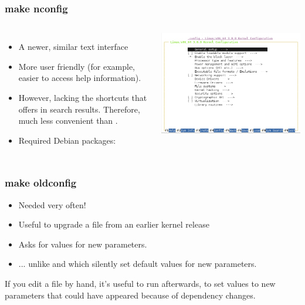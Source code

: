 \begin{frame}
  \frametitle{make nconfig}
  \begin{columns}
    \begin{itemize}
      \item A newer, similar text interface
      \item More user friendly (for example, easier to access help information).
      \item However, lacking the shortcuts that  offers
	in search results. Therefore, much less convenient than .
      \item Required Debian packages: 
    \end{itemize}
    \includegraphics[width=\textwidth]{slides/sysdev-kernel-building/nconfig-screenshot.png}
  \end{columns}
\end{frame}

\begin{frame}
  \frametitle{make oldconfig}
  \begin{itemize}
  \item Needed very often!
  \item Useful to upgrade a  file from an earlier kernel release
  \item Asks for values for new parameters.
  \item ... unlike  and  which silently set
  default values for new parameters.
  \end{itemize}
  If you edit a  file by hand, it's useful
  to run  afterwards, to set values to new
  parameters that could have appeared because of dependency changes.
\end{frame}

